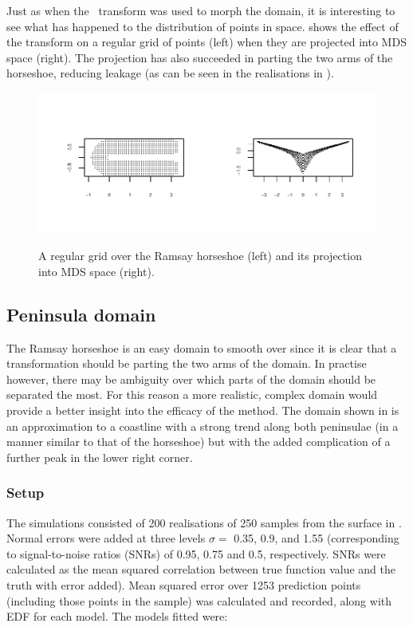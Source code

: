 {Just as when the \sch\ transform was used to morph the domain, it is interesting to see what has happened to the distribution of points in space.  shows the effect of the transform on a regular grid of points (left) when they are projected into MDS space (right). The projection has also succeeded in parting the two arms of the horseshoe, reducing leakage (as can be seen in the realisations in ).

\begin{figure}
\centering
\includegraphics[width=6in,trim=0.5in 0.5in 0in 0.5in]{mds/figs/mdsrampoints.pdf} \\
\caption{A regular grid over the Ramsay horseshoe (left) and its projection into MDS space (right).}
\label{mdsrampoints}
\end{figure}


\subsection{Peninsula domain}
\label{mds-wt2-sim}

The Ramsay horseshoe is an easy domain to smooth over since it is clear that a transformation should be parting the two arms of the domain. In practise however, there may be ambiguity over which parts of the domain should be separated the most. For this reason a more realistic, complex domain would provide a better insight into the efficacy of the method. The domain shown in  is an approximation to a coastline with a strong trend along both peninsulae (in a manner similar to that of the horseshoe) but with the added complication of a further peak in the lower right corner.

\subsubsection{Setup}

The simulations consisted of 200 realisations of 250 samples from the surface in . Normal errors were added at three levels $\sigma=$ 0.35, 0.9, and 1.55 (corresponding to signal-to-noise ratios (SNRs) of 0.95, 0.75 and 0.5, respectively. SNRs were calculated as the mean squared correlation between true function value and the truth with error added). Mean squared error over 1253 prediction points (including those points in the sample) was calculated and recorded, along with EDF for each model. The models fitted were:

}
